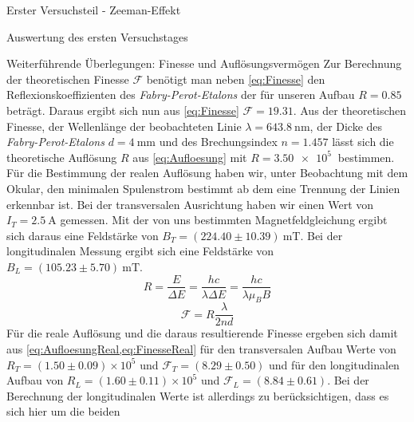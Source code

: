 \documentclass[pdftex, a4paper,11pt, twoside, ngerman]{report}
\begin{document}
\begin{chapter}{Erster Versuchsteil - Zeeman-Effekt}
\begin{section}{Auswertung des ersten Versuchstages}
      \begin{subsection}
      {Weiterführende Überlegungen: Finesse und Auflösungsvermögen}
        \label{chp:Zeeman:sec:AuswertungWeiteres}
        Zur Berechnung der theoretischen Finesse $\mathcal{F}$ benötigt man
        neben \cref{eq:Finesse} den Reflexionskoeffizienten des 
        \textit{Fabry-Perot-Etalons} der für unseren Aufbau $R=0.85$ beträgt.
        Daraus ergibt sich nun aus \cref{eq:Finesse} $\mathcal{F}=19.31$.
        Aus der theoretischen Finesse, der Wellenlänge der beobachteten Linie
        $\lambda=\SI{643.8}{\nano\meter}$, der Dicke des
        \textit{Fabry-Perot-Etalons} $d=\SI{4}{\milli\meter}$ und des
        Brechungsindex $n=1.457$ lässt sich die theoretische Auflösung $R$ aus
        \cref{eq:Aufloesung} mit $R=\SI{3.50e5}{}$ bestimmen. \newline
        Für die Bestimmung der realen Auflösung haben wir, unter Beobachtung
        mit dem Okular, den minimalen Spulenstrom bestimmt ab dem eine Trennung
        der Linien erkennbar ist. Bei der transversalen Ausrichtung haben wir
        einen Wert von $I_T=\SI{2.5}{\ampere}$ gemessen. Mit der von uns
        bestimmten Magnetfeldgleichung ergibt sich daraus eine Feldstärke von
        $B_T=(224.40\pm 10.39)\SI{}{\milli\tesla}$. Bei der longitudinalen
        Messung ergibt sich eine Feldstärke von 
        $B_L=(105.23\pm 5.70)\SI{}{\milli\tesla}$. 
        \begin{equation}
          \label{eq:AufloesungReal}
          R=\frac{E}{\Delta E}=\frac{hc}{\lambda\Delta E} = 
          \frac{hc}{\lambda\mu_{B}B}
        \end{equation}
        \begin{equation}
          \label{eq:FinesseReal}
          \mathcal{F}=R\frac{\lambda}{2nd}
        \end{equation}
        \newline
        Für die reale Auflösung und die daraus resultierende Finesse ergeben
        sich damit aus \cref{eq:AufloesungReal,eq:FinesseReal} für den
        transversalen Aufbau Werte von $R_{T}=(1.50\pm0.09) \times 10^{5}$ und
        $\mathcal{F}_{T}=(8.29\pm0.50)$ und für den longitudinalen Aufbau von
        $R_{L}=(1.60\pm 0.11) \times 10^{5}$ und
        $\mathcal{F}_{L}=(8.84\pm0.61)$. Bei der Berechnung der longitudinalen
        Werte ist allerdings zu berücksichtigen, dass es sich hier um die beiden

\end{subsection}
\end{section}
\end{chapter}
\end{document}
